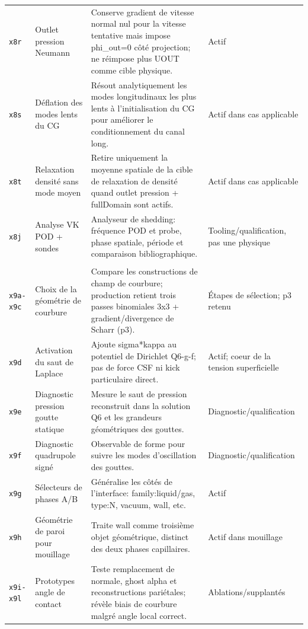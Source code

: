 \documentclass[a4paper,9pt]{article}
\begin{document}
\begin{landscape}
\begin{longtable}{L{2.35cm} L{5.3cm} L{13.25cm} L{4.75cm}}
\texttt{x8r} & Outlet pression Neumann & Conserve gradient de vitesse normal nul pour la vitesse tentative mais impose phi\_out=0 côté projection; ne réimpose plus UOUT comme cible physique. & Actif \\
\texttt{x8s} & Déflation des modes lents du CG & Résout analytiquement les modes longitudinaux les plus lents à l'initialisation du CG pour améliorer le conditionnement du canal long. & Actif dans cas applicable \\
\texttt{x8t} & Relaxation densité sans mode moyen & Retire uniquement la moyenne spatiale de la cible de relaxation de densité quand outlet pression + fullDomain sont actifs. & Actif dans cas applicable \\
\texttt{x8j} & Analyse VK POD + sondes & Analyseur de shedding: fréquence POD et probe, phase spatiale, période et comparaison bibliographique. & Tooling/qualification, pas une physique \\
\\
\texttt{x9a-x9c} & Choix de la géométrie de courbure & Compare les constructions de champ de courbure; production retient trois passes binomiales 3x3 + gradient/divergence de Scharr (p3). & Étapes de sélection; p3 retenu \\
\texttt{x9d} & Activation du saut de Laplace & Ajoute sigma*kappa au potentiel de Dirichlet Q6-g-f; pas de force CSF ni kick particulaire direct. & Actif; coeur de la tension superficielle \\
\texttt{x9e} & Diagnostic pression goutte statique & Mesure le saut de pression reconstruit dans la solution Q6 et les grandeurs géométriques des gouttes. & Diagnostic/qualification \\
\texttt{x9f} & Diagnostic quadrupole signé & Observable de forme pour suivre les modes d'oscillation des gouttes. & Diagnostic/qualification \\
\texttt{x9g} & Sélecteurs de phases A/B & Généralise les côtés de l'interface: family:liquid/gas, type:N, vacuum, wall, etc. & Actif \\
\texttt{x9h} & Géométrie de paroi pour mouillage & Traite wall comme troisième objet géométrique, distinct des deux phases capillaires. & Actif dans mouillage \\
\texttt{x9i-x9l} & Prototypes angle de contact & Teste remplacement de normale, ghost alpha et reconstructions pariétales; révèle biais de courbure malgré angle local correct. & Ablations/supplantés \\

\end{longtable}
\end{landscape}
\end{document}
